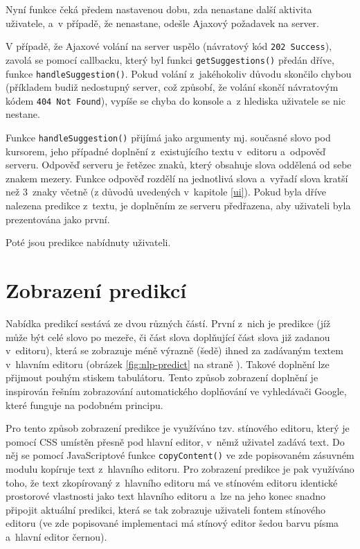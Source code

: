 \documentclass[a4paper,11pt,openany]{book} %
\begin{document}
Nyní funkce čeká předem nastavenou dobu, zda nenastane další aktivita uživatele, a~v případě, že nenastane, odešle Ajaxový požadavek na server.

V případě, že Ajaxové volání na server uspělo (návratový kód {\tt 202 Success}), zavolá se pomocí callbacku, který byl funkci {\tt getSuggestions()} předán dříve, funkce {\tt handleSuggestion()}. Pokud volání z~jakéhokoliv důvodu skončilo chybou (příkladem budiž nedostupný server, což způsobí, že volání skončí návratovým kódem {\tt 404 Not Found}), vypíše se chyba do konsole a~z hlediska uživatele se nic nestane. 

Funkce {\tt handleSuggestion()} přijímá jako argumenty mj. současné slovo pod kursorem, jeho případné doplnění z~existujícího textu v~editoru a~odpověď serveru. Odpověď serveru je řetězec znaků, který obsahuje slova oddělená od sebe znakem mezery. Funkce odpověď rozdělí na jednotlivá slova a~vyřadí slova kratší než 3~znaky včetně (z důvodů uvedených v~kapitole \ref{ui}). Pokud byla dříve nalezena predikce z~textu, je doplněním ze serveru předřazena, aby uživateli byla prezentována jako první.

Poté jsou predikce nabídnuty uživateli.

\section{Zobrazení predikcí}

Nabídka predikcí sestává ze dvou různých částí. První z~nich je predikce (jíž může být celé slovo po mezeře, či část slova doplňující část slova již zadanou v~editoru), která se zobrazuje méně výrazně (šedě) ihned za zadávaným textem v~hlavním editoru (obrázek \ref{fig:nlp-predict} na straně \pageref{fig:nlp-predict}). Takové doplnění lze přijmout pouhým stiskem tabulátoru. Tento způsob zobrazení doplnění je inspirován řešním zobrazování automatického doplňování ve vyhledávači Google, které funguje na podobném principu. 

Pro tento způsob zobrazení predikce je využíváno tzv. stínového editoru, který je pomocí CSS umístěn přesně pod hlavní editor, v~němž uživatel zadává text. Do něj se pomocí JavaScriptové funkce {\tt copyContent()} ve zde popisovaném zásuvném modulu kopíruje text z~hlavního editoru. Pro zobrazení predikce je pak využíváno toho, že text zkopírovaný z~hlavního editoru má ve stínovém editoru identické prostorové vlastnosti jako text hlavního editoru a~lze na jeho konec snadno připojit aktuální predikci, která se tak zobrazuje uživateli fontem stínového editoru (ve zde popisované implementaci má stínový editor šedou barvu písma a~hlavní editor černou).
\end{document}
